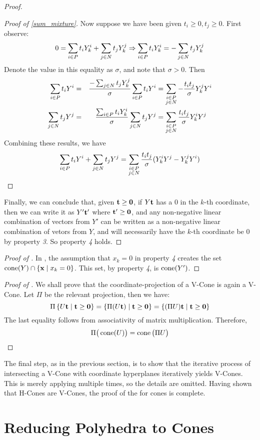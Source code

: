 \begin{proof}
\begin{proof}[Proof of \cref{sum_mixture}]
		Now suppose we have been given $t_i \geq 0, t_j \geq 0$.  First observe:
		\[ 0 = \sum_{i\in P} t_iY^i_{k} + \sum_{j\in N} t_jY^j_{k} \Rightarrow \sum_{i\in P} t_iY^i_{k} = -\sum_{j\in N} t_jY^j_{k}\]
		Denote the value in this equality as $\sigma$, and note that $\sigma > 0$.  Then
		\begin{alignat*}{3}
			\sum_{i\in P} t_i Y^i & = & \frac{-\sum_{j\in N} t_j Y^j_{k}}{\sigma}\sum_{i\in P} t_i Y^i & =
			\sum_{\substack{i\in P \\ j\in N}} -\frac{t_i t_j}{\sigma}Y^j_{k} Y^i                              \\
			\sum_{j\in N} t_j Y^j & = & \frac{\sum_{i\in P} t_i Y^i_{k}}{\sigma}\sum_{j\in N} t_j Y^j  & =
			\sum_{\substack{i\in P \\ j\in N}} \frac{t_i t_j}{\sigma}Y^i_{k} Y^j
		\end{alignat*}
		Combining these results, we have
		\[ \sum_{i\in P} t_i Y^i + \sum_{j\in N} t_j Y^j = \sum_{\substack{i\in P \\ j\in N}} \frac{t_i t_j}{\sigma}(Y^i_{k} Y^j - Y^j_{k} Y^i) \]
	\end{proof}
	Finally, we can conclude that, given $\mathbf{t} \geq \mathbf{0}$, if $Y\mathbf{t}$ has a $0$ in the $k$-th coordinate, then we can write it as $ Y'\mathbf{t}'$ where $\mathbf{t}' \geq \mathbf{0}$, and any non-negative linear combination of vectors from $Y'$ can be written as a non-negative linear combination of vetors from $Y$, and will necessarily have the $k$-th coordinate be $0$ by property \textit{3}.  So property \textit{4} holds.
\end{proof}

\begin{proof}[Proof of ]
	In , the assumption that $x_k = 0$ in property \textit{4} creates the set $\operatorname{cone}(Y) \cap \left\{\mathbf{x} \;|\; x_k = 0\right\}$.  This set, by property \textit{4}, is $\operatorname{cone}(Y')$.
\end{proof}

\begin{proof}[Proof of ]
	We shall prove that the coordinate-projection of a V-Cone is again a V-Cone.  Let $\Pi$ be the relevant projection, then we have:
	\[ \Pi\left\{U\mathbf{t} \;|\; \mathbf{t} \geq \mathbf{0}\right\} = \left\{\Pi(U\mathbf{t}) \;|\; \mathbf{t} \geq \mathbf{0}\right\} =
		\left\{(\Pi U)\mathbf{t} \;|\; \mathbf{t} \geq \mathbf{0}\right\} \]
	The last equality follows from associativity of matrix multiplication.  Therefore,
	\[ \Pi\big(\operatorname{cone}(U)\big) = \operatorname{cone}\big(\Pi U\big) \]
\end{proof}

The final step, as in the previous section, is to show that the iterative process of intersecting a V-Cone with coordinate hyperplanes iteratively yields V-Cones.  This is merely applying  multiple times, so the details are omitted.  Having shown that H-Cones are V-Cones, the proof of the {\MWT} for cones is complete.

\section{Reducing Polyhedra to Cones}

